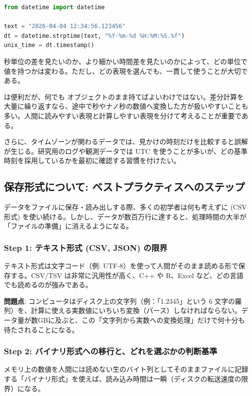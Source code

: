 \begin{lstlisting}[language=Python]
from datetime import datetime

text = "2026-04-04 12:34:56.123456"
dt = datetime.strptime(text, "%Y-%m-%d %H:%M:%S.%f")
unix_time = dt.timestamp()
\end{lstlisting}

秒単位の差を見たいのか、より細かい時間差を見たいのかによって、どの単位で値を持つかは変わる。ただし、どの表現を選んでも、一貫して使うことが大切である。

 は便利だが、何でも  オブジェクトのまま持てばよいわけではない。差分計算を大量に繰り返すなら、途中で秒やナノ秒の数値へ変換した方が扱いやすいことも多い。人間に読みやすい表現と計算しやすい表現を分けて考えることが重要である。

さらに、タイムゾーンが関わるデータでは、見かけの時刻だけを比較すると誤解が生じる。研究用のログや観測データでは UTC を使うことが多いが、どの基準時刻を採用しているかを最初に確認する習慣を付けたい。


\subsection{保存形式について: ベストプラクティスへのステップ}

データをファイルに保存・読み出しする際、多くの初学者は何も考えずに  (CSV形式) を使い続ける。しかし、データが数百万行に達すると、処理時間の大半が「ファイルの準備」に消えるようになる。

\subsubsection{Step 1: テキスト形式 (CSV, JSON) の限界}
テキスト形式は文字コード（例: UTF-8）を使って人間がそのまま読める形で保存する。CSV/TSV は非常に汎用性が高く、C++ や R、Excel など、どの言語でも読めるのが強みである。

\textbf{問題点}: コンピュータはディスク上の文字列（例：「1.2345」という 6 文字の羅列）を、計算に使える実数値にいちいち変換（パース）しなければならない。データ量が数GBに及ぶと、この「文字列から実数への変換処理」だけで何十分も待たされることになる。

\subsubsection{Step 2: バイナリ形式への移行と、どれを選ぶかの判断基準}
メモリ上の数値を人間には読めない生のバイト列としてそのままファイルに記録する「バイナリ形式」を使えば、読み込み時間は一瞬（ディスクの転送速度の限界）になる。

